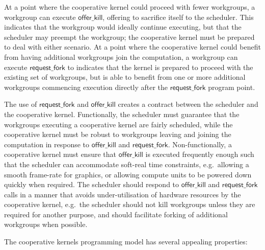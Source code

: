 \documentclass[parskip=half,sigconf,review, anonymous=true, acmcopyrightmode=none]{acmart}
\newcommand{\offerfork}{\mathsf{request\_fork}}
\newcommand{\offerkill}{\mathsf{offer\_kill}}
\begin{document}
At a point where the cooperative kernel could proceed with fewer
workgroups, a workgroup can execute $\offerkill$, offering to
sacrifice itself to the scheduler.  This indicates that the workgroup
would ideally continue executing, but that the
scheduler may preempt the workgroup; the cooperative kernel
must be prepared to deal with either scenario.
%
At a point where the cooperative kernel could benefit from having
additional workgroups join the computation, a workgroup can execute
$\offerfork$ to indicates that the
kernel is prepared to proceed with the existing set of workgroups, but
is able to benefit from one or more additional workgroups
commencing execution directly after the $\offerfork$ program point.

The use of $\offerfork$ and $\offerkill$ creates a contract between
the scheduler and the cooperative kernel.
Functionally, the
scheduler must guarantee that the workgroups executing a cooperative
kernel are fairly scheduled, while the cooperative kernel must be
robust to workgroups leaving and joining the computation in response
to $\offerkill$ and $\offerfork$.  Non-functionally, a cooperative
kernel must ensure that $\offerkill$ is executed frequently enough
such that the scheduler can accommodate soft-real time constraints,
e.g.\ allowing a smooth frame-rate for graphics, or allowing compute
units to be powered down quickly when required.  The scheduler should
respond to $\offerkill$ and $\offerfork$ calls in a manner that avoids
under-utilisation of hardware resources by the cooperative kernel,
e.g.\ the scheduler should not kill workgroups unless they are
required for another purpose, and should facilitate forking of
additional workgroups when possible.

The cooperative kernels programming model has several appealing
properties:
\end{document}
